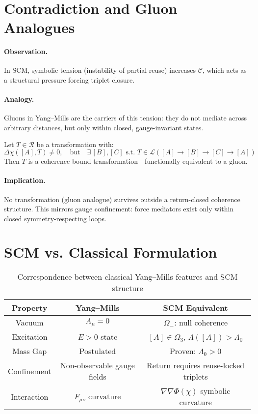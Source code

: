 \section{Contradiction and Gluon Analogues}

\paragraph{Observation.}
In SCM, symbolic tension (instability of partial reuse) increases \( \mathcal{C} \), which acts as a structural pressure forcing triplet closure.

\paragraph{Analogy.}
Gluons in Yang--Mills are the carriers of this tension: they do not mediate across arbitrary distances, but only within closed, gauge-invariant states.

\begin{definition}
Let \( T \in \mathcal{R} \) be a transformation with:
\[
\Delta \chi([A], T) \ne 0, \quad \text{but} \quad \exists \, [B], [C] \text{ s.t. } T \in \mathcal{L}([A] \to [B] \to [C] \to [A])
\]
Then \( T \) is a coherence-bound transformation—functionally equivalent to a gluon.

\end{definition}

\paragraph{Implication.}
No transformation (gluon analogue) survives outside a return-closed coherence structure. This mirrors gauge confinement: force mediators exist only within closed symmetry-respecting loops.

\section{SCM vs. Classical Formulation}

\begin{table}[h!]
\centering
\begin{tabular}{|c|c|c|}
\hline
\textbf{Property} & \textbf{Yang--Mills} & \textbf{SCM Equivalent} \\
\hline
Vacuum & \( A_\mu = 0 \) & \( \Omega_- \): null coherence \\
Excitation & \( E > 0 \) state & \( [A] \in \Omega_3 \), \( \Lambda([A]) > \Lambda_0 \) \\
Mass Gap & Postulated & Proven: \( \Lambda_0 > 0 \) \\
Confinement & Non-observable gauge fields & Return requires reuse-locked triplets \\
Interaction & \( F_{\mu\nu} \) curvature & \( \nabla \nabla \Phi(\chi) \) symbolic curvature \\
\hline
\end{tabular}
\caption{Correspondence between classical Yang--Mills features and SCM structure}
\end{table}

